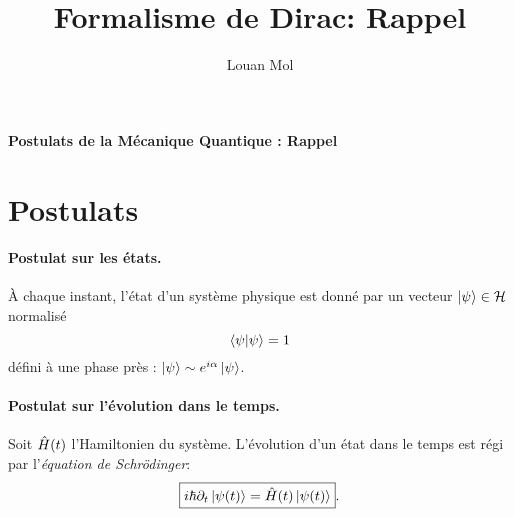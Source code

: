 \documentclass[11pt,a4paper,oneside]{article}
\title{Formalisme de Dirac: Rappel}
\author{Louan Mol}
\begin{document}
\begin{center}
    {\huge \textbf{Postulats de la Mécanique Quantique : Rappel}}
\end{center}

\vspace{1cm}

\qquad 

\section{Postulats}

\paragraph{Postulat  sur les états.} À chaque instant, l'état d'un système physique est donné par un vecteur $\ket{\psi_{}}\in\mathcal{H}$ normalisé
\begin{equation}
    \braket{\psi}=1
\end{equation}
défini à une phase près : $\ket{\psi_{}}\sim e^{i\alpha}\ket{\psi_{}}$.

\paragraph{Postulat sur l'évolution dans le temps.} Soit $\hat{H}(t)$ l'Hamiltonien du système. L'évolution d'un état dans le temps est régi par l'\emph{équation de Schrödinger}:
\begin{equation}
    \boxed{i\hbar\partial_t\ket{\psi(t)} = \hat{H}(t)\ket{\psi(t)}}.\label{eq:schr}
\end{equation}
\end{document}
